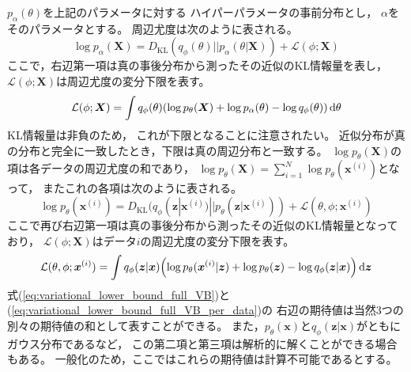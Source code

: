 \documentclass[dvipdfmx, fleqn, draft]{jsarticle}
\begin{document}
\(p_{\alpha} (\theta)\)を上記のパラメータに対する
ハイパーパラメータの事前分布とし，
\(\alpha\)をそのパラメータとする。
周辺尤度は次のように表される。
\begin{equation}
    \log{p_{\alpha} (\bm{X})}
        = D_\mathrm{KL} (q_{\phi} (\theta) || p_{\alpha} (\theta | \bm{X}))
            + \mathcal{L}(\phi; \bm{X})
\end{equation}
ここで，右辺第一項は真の事後分布から測ったその近似のKL情報量を表し，
\(\mathcal{L}(\phi; \bm{X})\)は周辺尤度の変分下限を表す。
\begin{equation}
    \mathcal{L}(\phi; \bm{X}) = \int q_{\phi} (\theta) \qty(\log{p_{\theta} (\bm{X})} + \log{p_{\alpha} (\theta)} - \log{q_{\phi} (\theta)}) \dd{\theta}
    \label{eq:variational_lower_bound_full_VB}
\end{equation}
KL情報量は非負のため，
これが下限となることに注意されたい。
近似分布が真の分布と完全に一致したとき，下限は真の周辺分布と一致する。
\(\log{p_{\theta} (\bm{X})}\)の項は各データの周辺尤度の和であり，
\(\log{p_{\theta} (\bm{X})} = \sum_{i=1}^{N} \log{p_{\theta} (\bm{x}^{(i)})}\)となって，
またこれの各項は次のように表される。
\begin{equation}
    \log{p_{\theta} (\bm{x}^{(i)})} = D_\mathrm{KL} (q_{\phi} (\bm{z} | \bm{x}^{(i)}) || p_{\theta} (\bm{z} | \bm{x}^{(i)})) + \mathcal{L}(\theta, \phi; \bm{x}^{(i)})
\end{equation}
ここで再び右辺第一項は真の事後分布から測ったその近似のKL情報量となっており，
\(\mathcal{L}(\phi; \bm{X})\)はデータ\(i\)の周辺尤度の変分下限を表す。
\begin{equation}
    \mathcal{L}(\theta, \phi; \bm{x}^{(i)}) = \int q_{\phi} (\bm{z} | \bm{x}) \qty(\log{p_{\theta} (\bm{x}^{(i)} | \bm{z})} + \log{p_{\theta} (\bm{z})} - \log{q_{\phi} (\bm{z} | \bm{x})}) \dd{\bm{z}}
    \label{eq:variational_lower_bound_full_VB_per_data}
\end{equation}
式(\ref{eq:variational_lower_bound_full_VB})と(\ref{eq:variational_lower_bound_full_VB_per_data})の
右辺の期待値は当然3つの別々の期待値の和として表すことができる。
また，\(p_{\theta} (\bm{x})\)と\(q_{\phi} (\bm{z} | \bm{x})\)がともにガウス分布であるなど，
この第二項と第三項は解析的に解くことができる場合もある。
一般化のため，ここではこれらの期待値は計算不可能であるとする。
\end{document}
